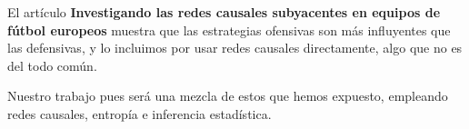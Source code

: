 El artículo \textbf{Investigando las redes causales subyacentes en equipos de fútbol europeos}\cite{cerqueira} 
muestra que las estrategias ofensivas son más influyentes que las defensivas, y lo incluimos por usar redes 
causales directamente, algo que no es del todo común. 

Nuestro trabajo pues será una mezcla de estos que hemos expuesto, empleando redes causales, entropía e inferencia 
estadística. 



 